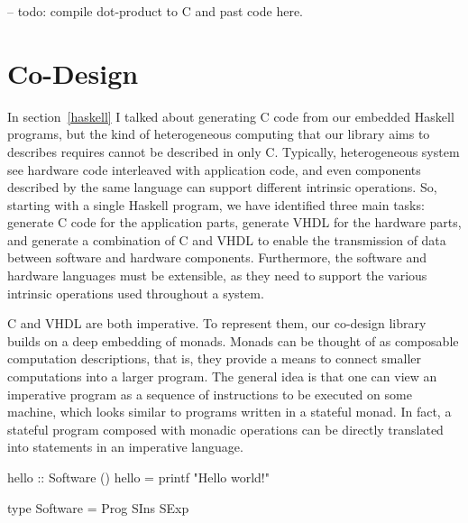 \begin{code}
-- todo: compile dot-product to C and past code here.
\end{code}


\section{Co-Design}

In section~\ref{haskell} I talked about generating C code from our embedded Haskell programs, but the kind of heterogeneous computing that our library aims to describes requires cannot be described in only C. Typically, heterogeneous system see hardware code interleaved with application code, and even components described by the same language can support different intrinsic operations. So, starting with a single Haskell program, we have identified three main tasks: generate C code for the application parts, generate VHDL for the hardware parts, and generate a combination of C and VHDL to enable the transmission of data between software and hardware components. Furthermore, the software and hardware languages must be extensible, as they need to support the various intrinsic operations used throughout a system.

C and VHDL are both imperative. To represent them, our co-design library builds on a deep embedding of monads. Monads can be thought of as composable computation descriptions, that is, they provide a means to connect smaller computations into a larger program. The general idea is that one can view an imperative program as a sequence of instructions to be executed on some machine, which looks similar to programs written in a stateful monad. In fact, a stateful program composed with monadic operations can be directly translated into statements in an imperative language.

\begin{code}
hello :: Software ()
hello = printf "Hello world!\n"
\end{code}

\lipsum[2]

\begin{code}
type Software = Prog SIns SExp
\end{code}

\lipsum[3]


